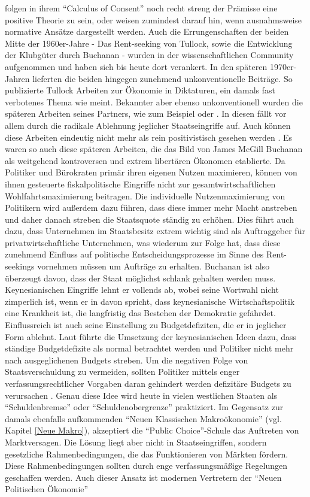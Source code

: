 \textcite{Buchanan1962} folgen in ihrem "`Calculus of Consent"' noch recht streng der Prämisse eine positive Theorie zu sein, oder weisen zumindest darauf hin, wenn ausnahmsweise normative Ansätze dargestellt werden. Auch die Errungenschaften der beiden Mitte der 1960er-Jahre - Das Rent-seeking von Tullock, sowie die Entwicklung der Klubgüter durch Buchanan - wurden in der wissenschaftlichen Community aufgenommen und haben sich bis heute dort verankert. In den späteren 1970er-Jahren lieferten die beiden hingegen zunehmend unkonventionelle Beiträge. So publizierte Tullock Arbeiten zur Ökonomie in Diktaturen, ein damals fast verbotenes Thema wie \textcite[S. 215]{Congleton2004} meint. Bekannter aber ebenso unkonventionell wurden die späteren Arbeiten seines Partners, wie zum Beispiel \textcite{Buchanan1977} oder \textcite{Buchanan1978}. In diesen fällt vor allem durch die radikale Ablehnung jeglicher Staatseingriffe auf. Auch können diese Arbeiten eindeutig nicht mehr als rein positivistisch gesehen werden \parencite[S. 105]{Mitchell1988}. Es waren so auch diese späteren Arbeiten, die das Bild von James McGill Buchanan als weitgehend kontroversen und extrem libertären Ökonomen etablierte. Da Politiker und Bürokraten primär ihren eigenen Nutzen maximieren, können von ihnen gesteuerte fiskalpolitische Eingriffe nicht zur gesamtwirtschaftlichen Wohlfahrtsmaximierung beitragen. Die individuelle Nutzenmaximierung von Politikern wird außerdem dazu führen, dass diese immer mehr Macht anstreben und daher danach streben die Staatsquote ständig zu erhöhen. Dies führt auch dazu, dass Unternehmen im Staatsbesitz extrem wichtig sind als Auftraggeber für privatwirtschaftliche Unternehmen, was wiederum zur Folge hat, dass diese zunehmend Einfluss auf politische Entscheidungsprozesse im Sinne des Rent-seekings vornehmen müssen um Aufträge zu erhalten. Buchanan ist also überzeugt davon, dass der Staat möglichst schlank gehalten werden muss. Keynesianischen Eingriffe lehnt er vollends ab, wobei seine Wortwahl nicht zimperlich ist, wenn er in \textcite{Buchanan1978} davon spricht, dass keynesianische Wirtschaftspolitik eine Krankheit ist, die langfristig das Bestehen der Demokratie gefährdet. Einflussreich ist auch seine Einstellung zu Budgetdefiziten, die er in jeglicher Form ablehnt. Laut \textcite{Buchanan1978} führte die Umsetzung der keynesianischen Ideen dazu, dass ständige Budgetdefizite als normal betrachtet werden und Politiker nicht mehr nach ausgeglichenen Budgets streben. Um die negativen Folge von Staatsverschuldung zu vermeiden, sollten Politiker mittels enger verfassungsrechtlicher Vorgaben daran gehindert werden defizitäre Budgets zu verursachen \parencite[S. 172]{Pressman1999}. Genau diese Idee wird heute in vielen westlichen Staaten als "`Schuldenbremse"' oder "`Schuldenobergrenze"' praktiziert. Im Gegensatz zur damals ebenfalls aufkommenden "`Neuen Klassischen Makroökonomie"' (vgl. Kapitel \ref{Neue Makro}), akzeptiert die "`Public Choice"'-Schule das Auftreten von Marktversagen. Die Lösung liegt aber nicht in Staatseingriffen, sondern gesetzliche Rahmenbedingungen, die das Funktionieren von Märkten fördern. Diese Rahmenbedingungen sollten durch enge verfassungsmäßige Regelungen geschaffen werden. Auch dieser Ansatz ist modernen Vertretern der "`Neuen Politischen Ökonomie"' 